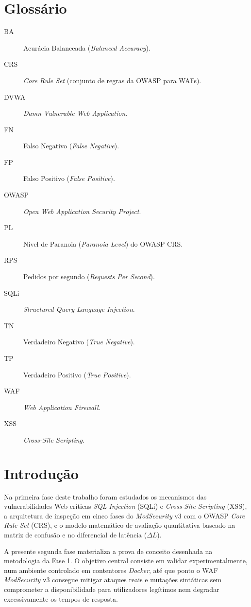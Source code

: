 \documentclass[11pt,a4paper]{article}
\begin{document}
\section*{Glossário}
\begin{description}
    \item[BA] Acurácia Balanceada (\textit{Balanced Accuracy}).
    \item[CRS] \textit{Core Rule Set} (conjunto de regras da OWASP para WAFs).
    \item[DVWA] \textit{Damn Vulnerable Web Application}.
    \item[FN] Falso Negativo (\textit{False Negative}).
    \item[FP] Falso Positivo (\textit{False Positive}).
    \item[OWASP] \textit{Open Web Application Security Project}.
    \item[PL] Nível de Paranoia (\textit{Paranoia Level}) do OWASP CRS.
    \item[RPS] Pedidos por segundo (\textit{Requests Per Second}).
    \item[SQLi] \textit{Structured Query Language Injection}.
    \item[TN] Verdadeiro Negativo (\textit{True Negative}).
    \item[TP] Verdadeiro Positivo (\textit{True Positive}).
    \item[WAF] \textit{Web Application Firewall}.
    \item[XSS] \textit{Cross-Site Scripting}.
\end{description}

\clearpage
\section{Introdução}
\label{sec:introducao}

Na primeira fase deste trabalho foram estudados os mecanismos das vulnerabilidades Web críticas \textit{SQL Injection} (SQLi) e \textit{Cross-Site Scripting} (XSS), a arquitetura de inspeção em cinco fases do \textit{ModSecurity} v3 com o OWASP \textit{Core Rule Set} (CRS), e o modelo matemático de avaliação quantitativa baseado na matriz de confusão e no diferencial de latência ($\Delta L$).

A presente segunda fase materializa a prova de conceito desenhada na metodologia da Fase 1. O objetivo central consiste em validar experimentalmente, num ambiente controlado em contentores \textit{Docker}, até que ponto o WAF \textit{ModSecurity} v3 consegue mitigar ataques reais e mutações sintáticas sem comprometer a disponibilidade para utilizadores legítimos nem degradar excessivamente os tempos de resposta.
\end{document}
